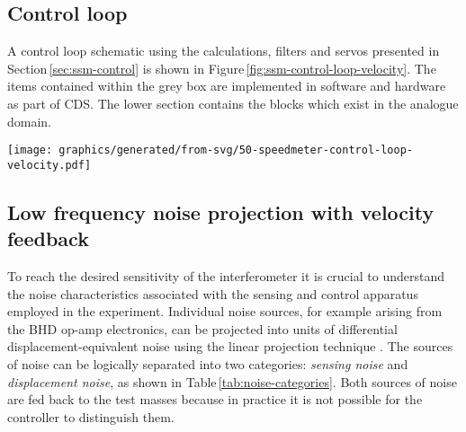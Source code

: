 \subsection{Control loop}

A control loop schematic using the calculations, filters and servos presented in Section\,\ref{sec:ssm-control} is shown in Figure\,\ref{fig:ssm-control-loop-velocity}. The items contained within the grey box are implemented in software and hardware as part of \gls{CDS}. The lower section contains the blocks which exist in the analogue domain.

\begin{sidewaysfigure}
  \texttt{[image: graphics/generated/from-svg/50-speedmeter-control-loop-velocity.pdf]}
  \caption[Modelled \SSMEXPT{} control loop using velocity feedback]{\label{fig:ssm-control-loop-velocity}Simple \SSM{} control loop model. The interferometer plant produces signals representing the probes in the interferometer, and sensing noise is added before the signals are sent to the digital controller, shown in the grey box. Within the controller, the error signal representing \LMINUS{} is fed through a series of filters and sent to the test mass actuators, with the addition of DAC noise. The suspension blocks transform the feedback signals into test mass displacements, and seismic, coating and suspension thermal noise is injected at the input to the interferometer plant. This configuration provides good sensitivity over short periods, but the intrinsic lack of low frequency sensitivity in the main velocity readout leads to drifts causing the arm cavities to lose resonance.}
\end{sidewaysfigure}

\subsection{\label{sec:noise-projection}Low frequency noise projection with velocity feedback}
To reach the desired sensitivity of the interferometer it is crucial to understand the noise characteristics associated with the sensing and control apparatus employed in the experiment. Individual noise sources, for example arising from the \gls{BHD} op-amp electronics, can be projected into units of differential displacement-equivalent noise using the linear projection technique \cite{Smith2006}. The sources of noise can be logically separated into two categories: \emph{sensing noise} and \emph{displacement noise}, as shown in Table\,\ref{tab:noise-categories}. Both sources of noise are fed back to the test masses because in practice it is not possible for the controller to distinguish them.

